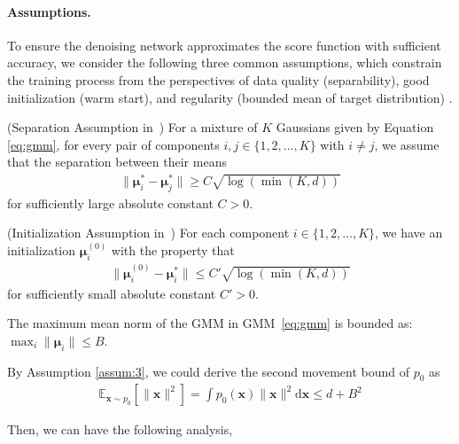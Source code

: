 \paragraph{Assumptions.}To ensure the denoising network approximates the score function with sufficient accuracy, we consider the following three common assumptions, which constrain the training process from the perspectives of data quality (separability), good initialization (warm start), and regularity (bounded mean of target distribution) \cite{chen2022sampling,chen2023improved,benton2024nearly}.
\begin{assumption}
\label{assum:1}
(Separation Assumption  in~\cite{shah2023learning})
 For a mixture of $K$ Gaussians given by Equation \ref{eq:gmm}, for every pair of components $i, j \in \{1, 2, \ldots, K\}$ with $i \neq j$, we assume that the separation between their means
\begin{align}
    \|\boldsymbol{{\mu}}^*_i - \boldsymbol{{\mu}}^*_j\| \geq C \sqrt{\log(\min(K, d))}
\end{align}
for sufficiently large absolute constant $C > 0$.
\end{assumption}
\begin{assumption}
\label{assum:2}
(Initialization Assumption  in~\cite{shah2023learning})
 For each component $i \in \{1, 2, \ldots, K\}$, we have an initialization $\boldsymbol{{\mu}}_i^{(0)}$ with the property that
\begin{align}
    \|\boldsymbol{{\mu}}_i^{(0)} - \boldsymbol{{\mu}}^*_i\| \leq C' \sqrt{\log(\min(K, d))}
\end{align}
for sufficiently small absolute constant $C' > 0$.
\end{assumption}
\begin{assumption}
\label{assum:3}
The maximum mean norm of the GMM in GMM~\ref{eq:gmm} is bounded as: \(\max_i \|\boldsymbol{{\mu}}_i\| \leq B\).
\end{assumption}

\begin{remark}
By Assumption \ref{assum:3}, we could derive the second movement bound  of $p_0$ as
\begin{align}
    \mathbb{E}_{\mathbf x\sim p_0}[\|\mathbf x\|^2] = \int p_0(\mathbf x) \|\mathbf x\|^2 \mathrm{d} \mathbf x \le d+B^2
\end{align}
\end{remark} 
Then, we can have the following analysis,

